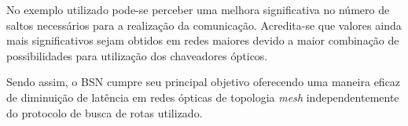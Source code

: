 \documentclass[12pt]{article}
\begin{document}
No exemplo utilizado pode-se perceber uma melhora significativa no número de saltos necessários para a realização da comunicação. Acredita-se que valores ainda mais significativos sejam obtidos em redes maiores devido a maior combinação de possibilidades para utilização dos chaveadores ópticos.

Sendo assim, o BSN cumpre seu principal objetivo oferecendo uma maneira eficaz de diminuição de latência em redes ópticas de topologia \emph{mesh} independentemente do protocolo de busca de rotas utilizado. 






\end{document}
